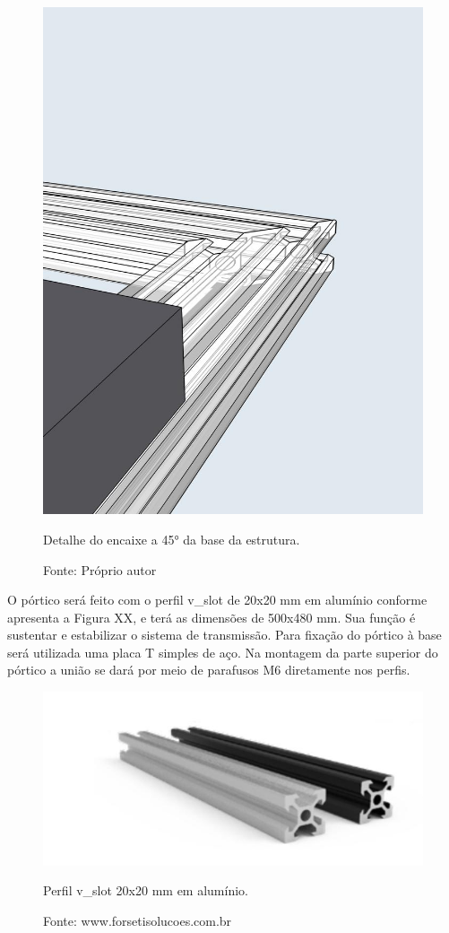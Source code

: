 \begin{figure}[!htb]
\centering
\includegraphics[scale = 0.25]{figuras/3-6}
\caption{Detalhe do encaixe a 45° da base da estrutura.}
\caption*{Fonte: Próprio autor}
\label{figdetalhe45}
\end{figure}
    
O pórtico será feito com o perfil v\_slot de 20x20 mm em alumínio conforme apresenta a Figura XX, 
e terá as dimensões de 500x480 mm. Sua função é sustentar e estabilizar o sistema de transmissão. 
Para fixação do pórtico à base será utilizada uma placa T simples de aço. Na montagem da parte 
superior do pórtico a união se dará por meio de parafusos M6 diretamente nos perfis.

\begin{figure}[!htb]
\centering
\includegraphics[scale = 0.5]{figuras/3-7}
\caption{Perfil v\_slot 20x20 mm em alumínio.}
\caption*{Fonte: www.forsetisolucoes.com.br}
\label{figp20x20p}
\end{figure}
    
